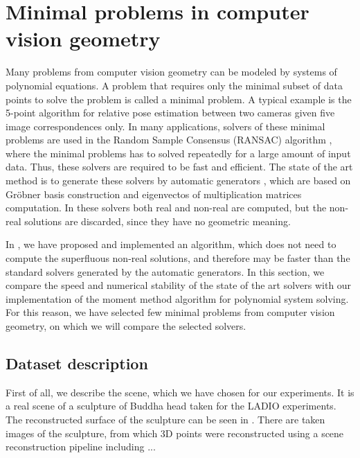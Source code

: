 \chapter{Minimal problems in computer vision geometry}
Many problems from computer vision geometry can be modeled by systems of polynomial equations.
A problem that requires only the minimal subset of data points to solve the problem is called a minimal problem.
A typical example is the 5-point algorithm \cite{5pt} for relative pose estimation between two cameras given five image correspondences only.
In many applications, solvers of these minimal problems are used in the Random Sample Consensus (RANSAC) algorithm \cite{ransac}, where the minimal problems has to solved repeatedly for a large amount of input data.
Thus, these solvers are required to be fast and efficient.
The state of the art method is to generate these solvers by automatic generators \cite{autogen}, which are based on Gr\"obner basis construction and eigenvectos of multiplication matrices computation.
In these solvers both real and non-real are computed, but the non-real solutions are discarded, since they have no geometric meaning.

In , we have proposed and implemented an algorithm, which does not need to compute the superfluous non-real solutions, and therefore may be faster than the standard solvers generated by the automatic generators.
In this section, we compare the speed and numerical stability of the state of the art solvers with our implementation of the moment method algorithm for polynomial system solving.
For this reason, we have selected few minimal problems from computer vision geometry, on which we will compare the selected solvers.

\section{Dataset description}

First of all, we describe the scene, which we have chosen for our experiments.
It is a real scene of a sculpture of Buddha head taken for the LADIO \cite{ladio} experiments.
The reconstructed surface of the sculpture can be seen in .
There are \importAppLADIONumCameras{} taken images of the sculpture, from which \importAppLADIONumPoints{} 3D points were reconstructed using a scene reconstruction pipeline including ...

